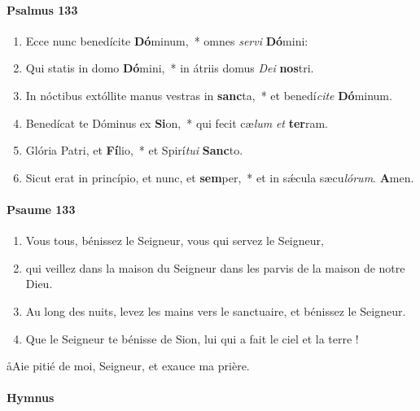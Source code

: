 \documentclass[twoside]{article}
\begin{document}
\begin{paracol}[1]{2}
\paragraph{Psalmus 133}
\begin{enumerate}[wide, itemsep=0mm, labelwidth=!, labelindent=0pt, label=\color{gregoriocolor}\theenumi]
\item Ecce nunc benedícite \textbf{Dó}minum,~* omnes \textit{ser}\textit{vi} \textbf{Dó}mini:
\item Qui statis in domo \textbf{Dó}mini,~* in átriis domus \textit{De}\textit{i} \textbf{nos}tri.
\item In nóctibus extóllite manus vestras in \textbf{sanc}ta,~* et benedí\textit{ci}\textit{te} \textbf{Dó}minum.
\item Benedícat te Dóminus ex \textbf{Si}on,~* qui fecit cæ\textit{lum} \textit{et} \textbf{ter}ram.
\item Glória Patri, et \textbf{Fí}lio,~* et Spirí\textit{tu}\textit{i} \textbf{Sanc}to.
\item Sicut erat in princípio, et nunc, et \textbf{sem}per,~* et in sǽcula sæcu\textit{ló}\textit{rum}. \textbf{A}men.
\end{enumerate}

\switchcolumn

\paragraph{Psaume 133}
\begin{enumerate}[wide, itemsep=0mm, labelwidth=!, labelindent=0pt, label=\color{gregoriocolor}\theenumi]
\item Vous tous, bénissez le Seigneur,
vous qui servez le Seigneur,
\item qui veillez dans la maison du Seigneur
dans les parvis de la maison de notre Dieu.
\item Au long des nuits, levez les mains vers le sanctuaire,
et bénissez le Seigneur.
\item Que le Seigneur te bénisse de Sion,
lui qui a fait le ciel et la terre !
\end{enumerate}
\switchcolumn*

\switchcolumn
\aa Aie pitié de moi, Seigneur, et exauce ma prière.
\pagebreak
\switchcolumn*

\paragraph{Hymnus}


\end{paracol}
\end{document}
